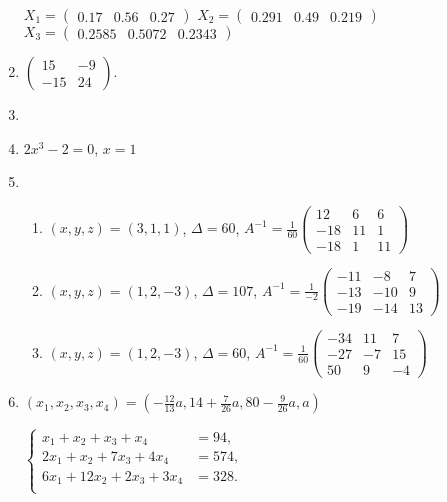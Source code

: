 \documentclass[a4paper,14pt]{extarticle}
\begin{document}
\begin{enumerate}[itemsep=5mm]
$X_1 = \begin{pmatrix}0.17 & 0.56 & 0.27\end{pmatrix}$\quad
$X_2 = \begin{pmatrix}0.291 & 0.49 & 0.219\end{pmatrix}$\quad
$X_3 = \begin{pmatrix}0.2585 & 0.5072 & 0.2343\end{pmatrix}$
\item %
$\begin{pmatrix}15 & -9\\ -15 & 24\end{pmatrix}$.
\item %
\item %
$2x^3 - 2 = 0$, $x=1$
\item %
	\begin{enumerate}
	\item 
		\underline{$(x,y,z)=(3,1,1)$},\quad
		$\Delta=60$, \quad
		$A^{-1}
			=\frac{1}{60}
			\begin{pmatrix}
				12 & 6 & 6\\
				-18 & 11 & 1\\
				-18 & 1 & 11
			\end{pmatrix}$
		
	\item 
		\underline{$(x,y,z)=(1,2,-3)$},\quad
		$\Delta=107$, \quad
		$A^{-1}
			=\frac{1}{-2}
			\begin{pmatrix}
				-11 & -8 & 7\\
				-13 & -10 & 9\\
				-19 & -14 & 13
			\end{pmatrix}$
	\item 
		\underline{$(x,y,z)=(1,2,-3)$},\quad
		$\Delta=60$, \quad
		$A^{-1}
			=\frac{1}{60}
			\begin{pmatrix}
				-34 & 11 & 7\\
				-27 & -7 & 15\\
				50 & 9 & -4
			\end{pmatrix}
			$
\end{enumerate}
\item %
\underline{$
(x_1,x_2,x_3,x_4) = (-\frac{12}{13} a, 14 + \frac{7}{26}a, 80 - \frac{9}{26} a, a)
$}

$
	\left\lbrace
	\begin{aligned}
		x_1 + x_2 + x_3 + x_4 &= 94,\\
		2x_1 + x_2 + 7x_3 + 4x_4 &= 574,\\
		6x_1 +12x_2 +2x_3 + 3x_4 &= 328.\\
	\end{aligned}
	\right.
$


\end{enumerate}
\end{document}
